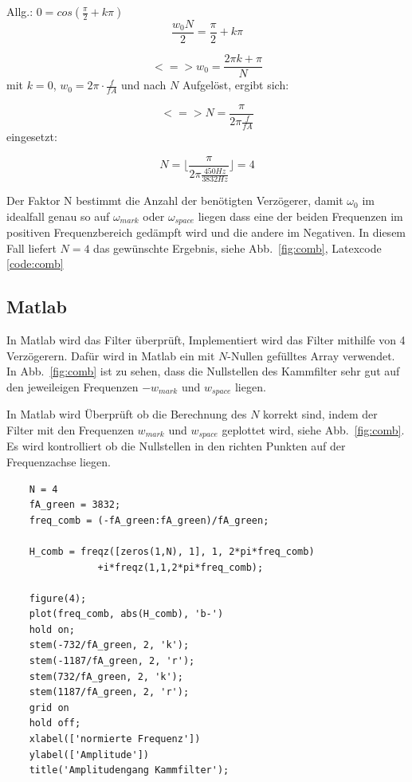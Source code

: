 \documentclass{article}
\begin{document}
Allg.: $0 = cos(\frac{\pi}{2} + k\pi)$
$$
\frac{w_0 N}{2} = \frac{\pi}{2} + k\pi
$$

$$
<=> w_0 = \frac{2\pi k + \pi}{N}
$$
mit $k = 0$, $w_0 = 2\pi \cdot \frac{f}{fA}$ und nach $N$ Aufgelöst, ergibt sich:

$$
<=> N = \frac{\pi}{2\pi \frac{f}{fA}}
$$
eingesetzt:

$$
N = \lfloor \frac{\pi}{2\pi \frac{450Hz}{3832Hz}}\rfloor = 4
$$

Der Faktor N bestimmt die Anzahl der benötigten Verzögerer, damit $\omega_0$ im idealfall genau so auf $\omega_{mark}$ oder $\omega_{space}$ liegen dass eine der beiden 
Frequenzen im positiven Frequenzbereich gedämpft wird und die andere im Negativen. In diesem Fall liefert $N = 4$ das gewünschte Ergebnis, siehe Abb.~\ref{fig:comb}, Latexcode \ref{code:comb}

\subsection{Matlab}
In Matlab wird das Filter überprüft, Implementiert wird das Filter mithilfe von 4 Verzögerern.
Dafür wird in Matlab ein mit $N$-Nullen gefülltes Array verwendet. In Abb.~\ref{fig:comb} ist zu sehen,
dass die Nullstellen des Kammfilter sehr gut auf den jeweileigen Frequenzen $- w_{mark}$ und $w_{space}$ liegen.

\begin{listing}
    \label{codeM:comb}
    \caption{In Matlab wird Überprüft ob die Berechnung des $N$ korrekt sind, indem der Filter mit den Frequenzen
    $w_{mark}$ und $w_{space}$ geplottet wird, siehe Abb.~\ref{fig:comb}. Es wird kontrolliert ob die Nullstellen in den richten Punkten auf der Frequenzachse liegen.}
\begin{verbatim}
    N = 4
    fA_green = 3832;
    freq_comb = (-fA_green:fA_green)/fA_green;
    
    H_comb = freqz([zeros(1,N), 1], 1, 2*pi*freq_comb)
                +i*freqz(1,1,2*pi*freq_comb);
    
    figure(4);
    plot(freq_comb, abs(H_comb), 'b-')
    hold on;
    stem(-732/fA_green, 2, 'k');
    stem(-1187/fA_green, 2, 'r');
    stem(732/fA_green, 2, 'k');
    stem(1187/fA_green, 2, 'r');
    grid on
    hold off;
    xlabel(['normierte Frequenz'])
    ylabel(['Amplitude'])
    title('Amplitudengang Kammfilter');
\end{verbatim}
\end{listing}
\end{document}
